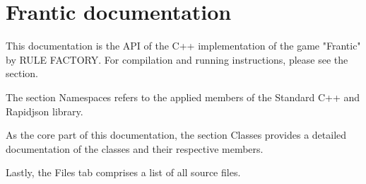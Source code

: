 \chapter{Frantic documentation }
\hypertarget{index}{}\label{index}
This documentation is the API of the C++ implementation of the game "{}\+Frantic"{} by RULE FACTORY. For compilation and running instructions, please see the  section.


\begin{DoxyItemize}
\item The section Namespaces refers to the applied members of the Standard C++ and Rapidjson library.
\item As the core part of this documentation, the section Classes provides a detailed documentation of the classes and their respective members.
\item Lastly, the Files tab comprises a list of all source files. 
\end{DoxyItemize}
